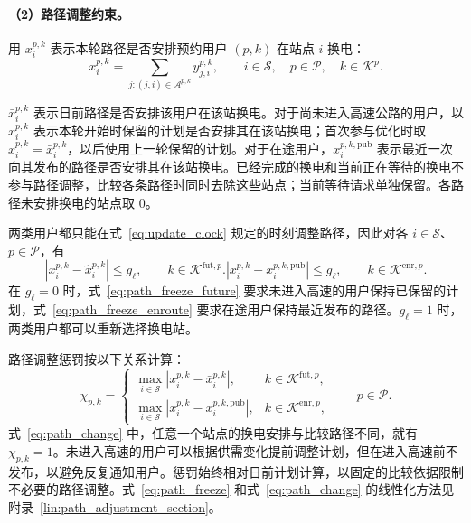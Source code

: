 \paragraph{（2）路径调整约束。}
用 $x_i^{p,k}$ 表示本轮路径是否安排预约用户 $(p,k)$ 在站点 $i$ 换电：
\begin{equation}
x_i^{p,k}=\sum_{j:(j,i)\in\mathcal A^{p,k}}y_{j,i}^{p,k},
\qquad i\in\mathcal S,\quad p\in\mathcal P,\quad k\in\mathcal K^p.
\label{eq:station_visit}
\end{equation}


$\bar x_i^{p,k}$ 表示日前路径是否安排该用户在该站换电。对于尚未进入高速公路的用户，以 $\widehat x_i^{p,k}$ 表示本轮开始时保留的计划是否安排其在该站换电；首次参与优化时取 $\widehat x_i^{p,k}=\bar x_i^{p,k}$，以后使用上一轮保留的计划。对于在途用户，$x_i^{p,k,\mathrm{pub}}$ 表示最近一次向其发布的路径是否安排其在该站换电。已经完成的换电和当前正在等待的换电不参与路径调整，比较各条路径时同时去除这些站点；当前等待请求单独保留。各路径未安排换电的站点取 $0$。

两类用户都只能在式~\eqref{eq:update_clock} 规定的时刻调整路径，因此对各 $i\in\mathcal S$、$p\in\mathcal P$，有
\begin{subequations}\label{eq:path_freeze}
\begin{equation}
|x_i^{p,k}-\widehat x_i^{p,k}|\le g_\ell,
\qquad k\in\mathcal K^{\mathrm{fut},p}.
\label{eq:path_freeze_future}
\end{equation}
\begin{equation}
|x_i^{p,k}-x_i^{p,k,\mathrm{pub}}|\le g_\ell,
\qquad k\in\mathcal K^{\mathrm{enr},p}.
\label{eq:path_freeze_enroute}
\end{equation}
\end{subequations}
在 $g_\ell=0$ 时，式~\eqref{eq:path_freeze_future} 要求未进入高速的用户保持已保留的计划，式~\eqref{eq:path_freeze_enroute} 要求在途用户保持最近发布的路径。$g_\ell=1$ 时，两类用户都可以重新选择换电站。

路径调整惩罚按以下关系计算：
\begin{equation}
\chi_{p,k}=\begin{cases}
\displaystyle\max_{i\in\mathcal S}|x_i^{p,k}-\bar x_i^{p,k}|,
&k\in\mathcal K^{\mathrm{fut},p},\\
\displaystyle\max_{i\in\mathcal S}|x_i^{p,k}-x_i^{p,k,\mathrm{pub}}|,
&k\in\mathcal K^{\mathrm{enr},p},
\end{cases}
\qquad p\in\mathcal P.
\label{eq:path_change}
\end{equation}
式~\eqref{eq:path_change} 中，任意一个站点的换电安排与比较路径不同，就有 $\chi_{p,k}=1$。未进入高速的用户可以根据供需变化提前调整计划，但在进入高速前不发布，以避免反复通知用户。惩罚始终相对日前计划计算，以固定的比较依据限制不必要的路径调整。式~\eqref{eq:path_freeze} 和式~\eqref{eq:path_change} 的线性化方法见附录~\ref{lin:path_adjustment_section}。

